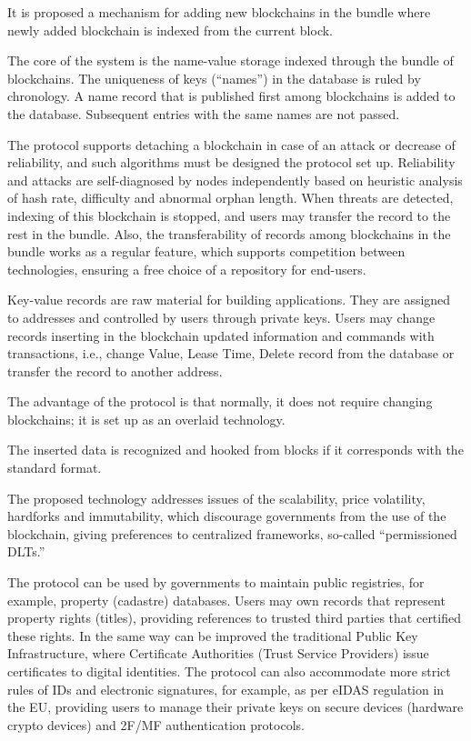 \begin{multicols}{2}
It is proposed a mechanism for adding new blockchains in the bundle where newly added blockchain is indexed from the current block.

The core of the system is the name-value storage indexed through the bundle of blockchains. The uniqueness of keys (“names”) in the database is ruled by chronology. A name record that is published first among blockchains is added to the database. Subsequent entries with the same names are not passed.

The protocol supports detaching a blockchain in case of an attack or decrease of reliability, and such algorithms must be designed the protocol set up. Reliability and attacks are self-diagnosed by nodes independently based on heuristic analysis of hash rate, difficulty and abnormal orphan length. When threats are detected, indexing of this blockchain is stopped, and users may transfer the record to the rest in the bundle. Also, the transferability of records among blockchains in the bundle works as a regular feature, which supports competition between technologies, ensuring a free choice of a repository for end-users.

Key-value records are raw material for building applications. They are assigned to addresses and controlled by users through private keys. Users may change records inserting in the blockchain updated information and commands with transactions, i.e., change Value, Lease Time, Delete record from the database or transfer the record to another address.

The advantage of the protocol is that normally, it does not require changing blockchains; it is set up as an overlaid technology.

The inserted data is recognized and hooked from blocks if it corresponds with the standard format. 

The proposed technology addresses issues of the scalability, price volatility, hardforks and immutability, which discourage governments from the use of the blockchain, giving preferences to centralized frameworks, so-called “permissioned DLTs.” 

The protocol can be used by governments to maintain public registries, for example, property (cadastre) databases. Users may own records that represent property rights (titles), providing references to trusted third parties that certified these rights. In the same way can be improved the traditional Public Key Infrastructure, where Certificate Authorities (Trust Service Providers) issue certificates to digital identities. The protocol can also accommodate more strict rules of IDs and electronic signatures, for example, as per eIDAS regulation in the EU, providing users to manage their private keys on secure devices (hardware crypto devices) and 2F/MF authentication protocols.


\end{multicols}

